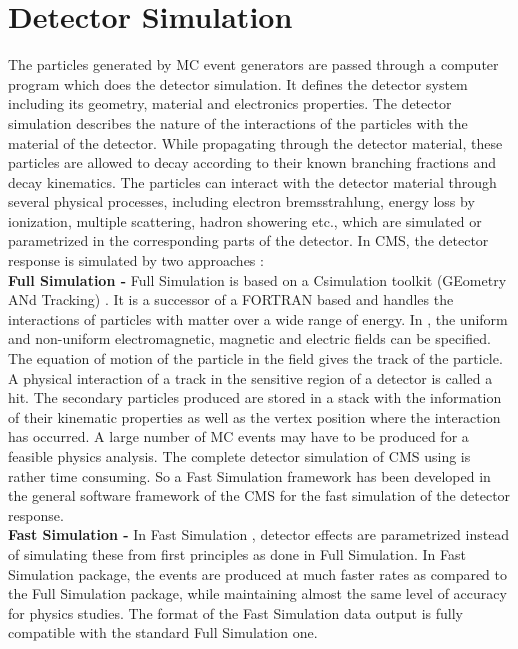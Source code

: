 \section{Detector Simulation}
The particles generated by MC event generators are passed through a computer program which does the detector simulation. It defines the detector system including its geometry, material and electronics properties. The detector simulation describes the nature of the interactions of the particles with the material of the detector. While propagating through the detector material, these particles are allowed to decay according to their known branching fractions and decay kinematics. The particles can interact with the detector material through several physical processes, including electron bremsstrahlung, energy loss by ionization, multiple scattering, hadron showering etc., which are simulated or parametrized in the corresponding parts of the detector. In CMS, the detector response is simulated by two approaches : \\ \newline
{\bf Full Simulation -} Full Simulation is based on a C\plusn\plus simulation toolkit \GEANTfour (GEometry ANd Tracking) \cite{Agostinelli:2002hh}. It is a successor of a FORTRAN based \GEANTthree and handles the interactions of particles with matter over a wide range of energy. In \GEANTfour, the uniform and non-uniform electromagnetic, magnetic and electric fields can be specified. The equation of motion of the particle in the field gives the track of the particle. A physical interaction of a track in the sensitive region of a detector is called a hit. The secondary particles produced are stored in a stack with the information of their kinematic properties as well as the vertex position where the interaction has occurred. A large number of MC events may have to be produced for a feasible physics analysis. The complete detector simulation of CMS using \GEANTfour is rather time consuming. So a Fast Simulation framework has been developed in the general software framework of the CMS for the fast simulation of the detector response.\\ \newline 
{\bf Fast Simulation -} In Fast Simulation \cite{Abdullin:2011zz}, detector effects are parametrized instead of simulating these from first principles as done in Full Simulation. In Fast Simulation package, the events are produced at much faster rates as compared to the Full Simulation package, while maintaining almost the same level of accuracy for physics studies. The format of the Fast Simulation data output is fully compatible with the standard Full Simulation one. 

